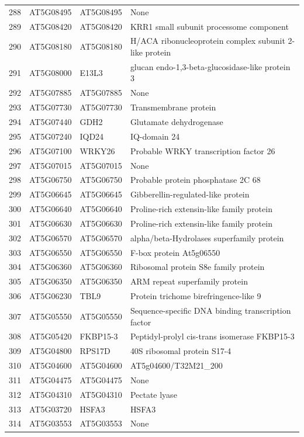 \documentclass[11pt]{article}
\begin{document}
\begin{center}
\begin{tabular}{rlll}
288 & AT5G08495 & AT5G08495 & None\\
289 & AT5G08420 & AT5G08420 & KRR1 small subunit processome component\\
290 & AT5G08180 & AT5G08180 & H/ACA ribonucleoprotein complex subunit 2-like protein\\
291 & AT5G08000 & E13L3 & glucan endo-1,3-beta-glucosidase-like protein 3\\
292 & AT5G07885 & AT5G07885 & None\\
293 & AT5G07730 & AT5G07730 & Transmembrane protein\\
294 & AT5G07440 & GDH2 & Glutamate dehydrogenase\\
295 & AT5G07240 & IQD24 & IQ-domain 24\\
296 & AT5G07100 & WRKY26 & Probable WRKY transcription factor 26\\
297 & AT5G07015 & AT5G07015 & None\\
298 & AT5G06750 & AT5G06750 & Probable protein phosphatase 2C 68\\
299 & AT5G06645 & AT5G06645 & Gibberellin-regulated-like protein\\
300 & AT5G06640 & AT5G06640 & Proline-rich extensin-like family protein\\
301 & AT5G06630 & AT5G06630 & Proline-rich extensin-like family protein\\
302 & AT5G06570 & AT5G06570 & alpha/beta-Hydrolases superfamily protein\\
303 & AT5G06550 & AT5G06550 & F-box protein At5g06550\\
304 & AT5G06360 & AT5G06360 & Ribosomal protein S8e family protein\\
305 & AT5G06350 & AT5G06350 & ARM repeat superfamily protein\\
306 & AT5G06230 & TBL9 & Protein trichome birefringence-like 9\\
307 & AT5G05550 & AT5G05550 & Sequence-specific DNA binding transcription factor\\
308 & AT5G05420 & FKBP15-3 & Peptidyl-prolyl cis-trans isomerase FKBP15-3\\
309 & AT5G04800 & RPS17D & 40S ribosomal protein S17-4\\
310 & AT5G04600 & AT5G04600 & AT5g04600/T32M21\_200\\
311 & AT5G04475 & AT5G04475 & None\\
312 & AT5G04310 & AT5G04310 & Pectate lyase\\
313 & AT5G03720 & HSFA3 & HSFA3\\
314 & AT5G03553 & AT5G03553 & None\\

\end{tabular}
\end{center}
\end{document}
